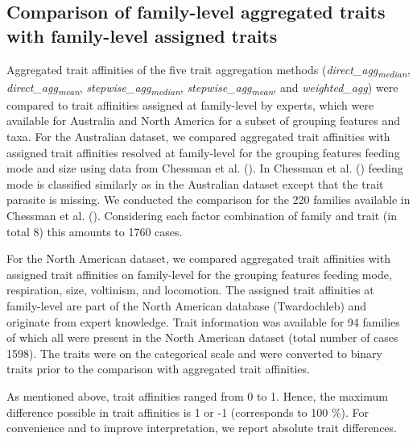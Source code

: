 \documentclass{article}
\begin{document}

\subsection*{Comparison of family-level aggregated traits with family-level assigned traits}

Aggregated trait affinities of the five trait aggregation methods (\textit{direct\_agg\textsubscript{median}}, \textit{direct\_agg\textsubscript{mean}}, \textit{stepwise\_agg\textsubscript{median}}, \textit{stepwise\_agg\textsubscript{mean}}, and \textit{weighted\_agg}) were compared to trait affinities assigned at family-level by experts, which were available for Australia and North America for a subset of grouping features and taxa. For the Australian dataset, we compared aggregated trait affinities with assigned trait affinities resolved at family-level for the grouping features feeding mode and size using data from Chessman et al. (\cite{chessman_dissolved-oxygen_2018}). In Chessman et al. (\cite{chessman_dissolved-oxygen_2018}) feeding mode is classified similarly as in the Australian dataset except that the trait parasite is missing. We conducted the comparison for the 220 families available in Chessman et al. (\cite{chessman_dissolved-oxygen_2018}). Considering each factor combination of family and trait (in total 8) this amounts to 1760 cases.

For the North American dataset, we compared aggregated trait affinities with assigned trait affinities on family-level for the grouping features feeding mode, respiration, size, voltinism, and locomotion. The assigned trait affinities at family-level are part of the North American database (Twardochleb) and originate from expert knowledge. Trait information was available for 94 families of which all were present in the North American dataset (total number of cases 1598). The traits were on the categorical scale and were converted to binary traits prior to the comparison with aggregated trait affinities.

As mentioned above, trait affinities ranged from 0 to 1. Hence, the maximum difference possible in trait affinities is 1 or -1 (corresponds to 100 \%). For convenience and to improve interpretation, we report absolute trait differences.


\end{document}
